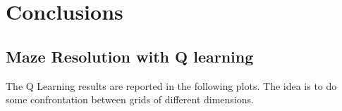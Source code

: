 \chapter*{Conclusions}
\fancyhf{}
\fancyfoot[LE,RO]{\large \thepage}

\section{Maze Resolution with Q learning}
The Q Learning results are reported in the following plots. 
The idea is to do some confrontation between grids of different dimensions.
